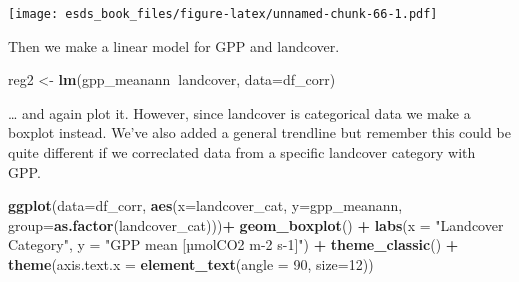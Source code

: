 \documentclass[
]{book}
\newenvironment{Shaded}{\begin{snugshade}}{\end{snugshade}}
\newcommand{\DataTypeTok}[1]{\textcolor[rgb]{0.13,0.29,0.53}{#1}}
\newcommand{\DecValTok}[1]{\textcolor[rgb]{0.00,0.00,0.81}{#1}}
\newcommand{\FloatTok}[1]{\textcolor[rgb]{0.00,0.00,0.81}{#1}}
\newcommand{\KeywordTok}[1]{\textcolor[rgb]{0.13,0.29,0.53}{\textbf{#1}}}
\newcommand{\NormalTok}[1]{#1}
\newcommand{\OperatorTok}[1]{\textcolor[rgb]{0.81,0.36,0.00}{\textbf{#1}}}
\newcommand{\OtherTok}[1]{\textcolor[rgb]{0.56,0.35,0.01}{#1}}
\newcommand{\StringTok}[1]{\textcolor[rgb]{0.31,0.60,0.02}{#1}}
\begin{document}
\begin{Shaded}
\end{Shaded}

\texttt{[image: esds\_book\_files/figure-latex/unnamed-chunk-66-1.pdf]}

Then we make a linear model for GPP and landcover.

\begin{Shaded}
\begin{Highlighting}[]
\NormalTok{reg2 <-}\StringTok{ }\KeywordTok{lm}\NormalTok{(gpp_meanann}\OperatorTok{~}\NormalTok{landcover, }\DataTypeTok{data=}\NormalTok{df_corr)}
\end{Highlighting}
\end{Shaded}

\ldots{} and again plot it. However, since landcover is categorical data we make a boxplot instead. We've also added a general trendline but remember this could be quite different if we correclated data from a specific landcover category with GPP.

\begin{Shaded}
\begin{Highlighting}[]
\KeywordTok{ggplot}\NormalTok{(}\DataTypeTok{data=}\NormalTok{df_corr, }\KeywordTok{aes}\NormalTok{(}\DataTypeTok{x=}\NormalTok{landcover_cat, }\DataTypeTok{y=}\NormalTok{gpp_meanann, }\DataTypeTok{group=}\KeywordTok{as.factor}\NormalTok{(landcover_cat)))}\OperatorTok{+}\StringTok{ }
\StringTok{        }\KeywordTok{geom_boxplot}\NormalTok{() }\OperatorTok{+}\StringTok{ }
\StringTok{        }\KeywordTok{labs}\NormalTok{(}\DataTypeTok{x =} \StringTok{"Landcover Category"}\NormalTok{, }\DataTypeTok{y =} \StringTok{"GPP mean [µmolCO2 m-2 s-1]"}\NormalTok{) }\OperatorTok{+}
\StringTok{        }\KeywordTok{theme_classic}\NormalTok{() }\OperatorTok{+}
\StringTok{        }\KeywordTok{theme}\NormalTok{(}\DataTypeTok{axis.text.x =} \KeywordTok{element_text}\NormalTok{(}\DataTypeTok{angle =} \DecValTok{90}\NormalTok{, }\DataTypeTok{size=}\DecValTok{12}\NormalTok{))}
\end{Highlighting}
\end{Shaded}
\end{document}
